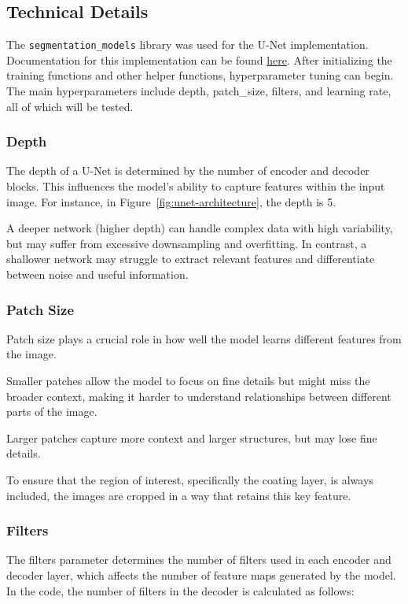 \subsection{Technical Details}
The \texttt{segmentation\_models} library \cite{Iakubovskii:2019} was used for the U-Net implementation. Documentation for this implementation can be found \href{https://smp.readthedocs.io/en/latest/models.html#id22}{here}\cite{SegmentationModelsPyTorch}. After initializing the training functions and other helper functions, hyperparameter tuning can begin. The main hyperparameters include depth, patch\_size, filters, and learning rate, all of which will be tested.

\subsubsection{Depth}
The depth of a U-Net is determined by the number of encoder and decoder blocks. This influences the model's ability to capture features within the input image. For instance, in Figure~\ref{fig:unet-architecture}, the depth is 5.

A deeper network (higher depth) can handle complex data with high variability, but may suffer from excessive downsampling and overfitting. In contrast, a shallower network may struggle to extract relevant features and differentiate between noise and useful information.

\subsubsection{Patch Size}
Patch size plays a crucial role in how well the model learns different features from the image.

Smaller patches allow the model to focus on fine details but might miss the broader context, making it harder to understand relationships between different parts of the image.

Larger patches capture more context and larger structures, but may lose fine details.

To ensure that the region of interest, specifically the coating layer, is always included, the images are cropped in a way that retains this key feature.

\subsubsection{Filters}
The filters parameter determines the number of filters used in each encoder and decoder layer, which affects the number of feature maps generated by the model. In the code, the number of filters in the decoder is calculated as follows:

